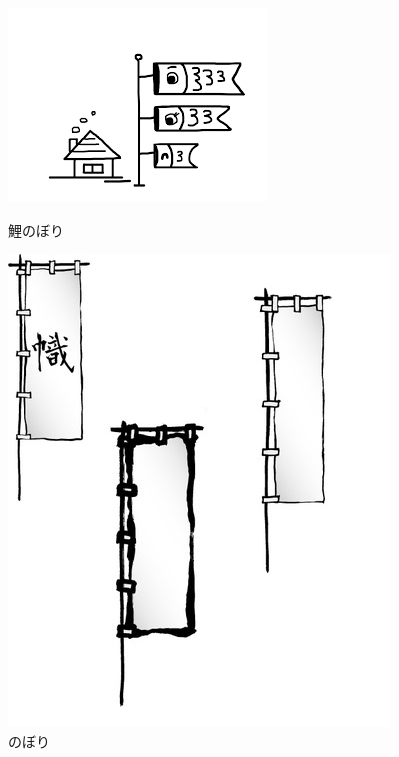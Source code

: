 	\begin{figure}[h]
		\centering
		\begin{minipage}{.45\textwidth}
			\centering
			\includegraphics[width=\textwidth]{00x_citanje_tango_res/koinobori}
			\caption{鯉のぼり}
		\end{minipage}
		\begin{minipage}{.45\textwidth}
			\centering
			\includegraphics[width=.6\textwidth]{00x_citanje_tango_res/nobori}
			\caption{のぼり}
		\end{minipage}
	\end{figure}

	\newpage

